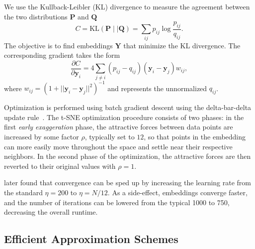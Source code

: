 \documentclass[article]{jss}
\begin{document}
We use the Kullback-Leibler (KL) divergence to measure the agreement
between the two distributions $\mathbf{P}$ and $\mathbf{Q}$
\begin{equation}
C = \text{KL}(\mathbf{P} \mid \mid \mathbf{Q}) = \sum_{ij} p_{ij} \log \frac{p_{ij}}{q_{ij}}.
\label{eq:kl_divergence}
\end{equation}
The objective is to find embeddings $\mathbf{Y}$ that minimize the KL divergence. The corresponding gradient takes the form
\begin{equation}
\frac{\partial C}{\partial \mathbf{y}_i} = 4 \sum_{j \neq i} \left ( p_{ij} - q_{ij} \right ) \left ( \mathbf{y}_i - \mathbf{y}_j \right ) w_{ij},
\label{eq:tsne_gradient}
\end{equation}
where $w_{ij} = \left ( 1 + || \mathbf{y}_i - \mathbf{y}_j || ^2 \right )^{-1}$
and represents the unnormalized $q_{ij}$.

Optimization is performed using batch gradient descent using the delta-bar-delta update rule~\citep{jacobs1988increased}. The t-SNE optimization procedure consists of two phases: in the first \textit{early exaggeration} phase, the attractive forces between data points are increased by some factor $\rho$, typically set to $12$, so that points in the embedding can more easily move throughout the space and settle near their respective neighbors. In the second phase of the optimization, the attractive forces are then reverted to their original values with $\rho=1$.

\citet{belkina2019automated} later found that convergence can be sped up by
increasing the learning rate from the standard $\eta=200$ to $\eta=N/12$. As a
side-effect, embeddings converge faster, and the number of iterations can be
lowered from the typical 1000 to 750, decreasing the overall runtime.

\subsection{Efficient Approximation Schemes} \label{sec:meth.approx}
\end{document}
